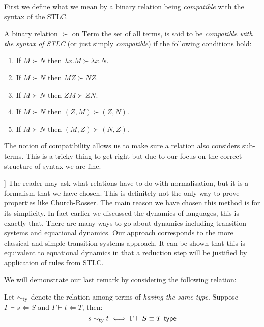 First we define what we mean by a binary relation being \emph{compatible} with the syntax of the STLC.
\begin{defin}
    A binary relation $\succ$ on $\mathrm{Term}$ the set of all terms, is said to be \emph{compatible with the syntax of STLC} (or just simply \emph{compatible}) if the following conditions hold:
    \begin{enumerate}
        \item If $M \succ N$ then $\lambda x . M \succ \lambda x . N$.
        \item If $M \succ N$ then $M Z \succ N Z$.
        \item If $M \succ N$ then $Z M \succ Z N$.
        \item If $M \succ N$ then $(Z,M) \succ (Z,N)$.
        \item If $M \succ N$ then $(M, Z) \succ (N, Z)$.
    \end{enumerate}
\end{defin}

\begin{remark}
    The notion of compatibility allows us to make sure a relation also considers sub-terms. This is a tricky thing to get right but due to our focus on the correct structure of syntax we are fine.
\end{remark}

\begin{remark}
[[CLEAN THIS UP]]
    The reader may ask what relations have to do with normalisation, but it is a formalism that we have chosen. This is definitely not the only way to prove properties like Church-Rosser. The main reason we have chosen this method is for its simplicity. In fact earlier we discussed the dynamics of languages, this is exactly that. There are many ways to go about dynamics including transition systems and equational dynamics. Our approach corresponds to the more classical and simple transition systems approach. It can be shown that this is equivalent to equational dynamics in that a reduction step will be justified by application of rules from STLC.
\end{remark}

We will demonstrate our last remark by considering the following relation:

\begin{defin}
    Let $\sim_{\mathrm{ty}}$ denote the relation among terms of \emph{having the same type}. Suppose $\Gamma \vdash s \Leftarrow S$ and $\Gamma \vdash t \Leftarrow T$, then:
    $$
        s \sim_{\mathrm{ty}} t \iff \Gamma \vdash S \equiv T \ \mathsf{type}
    $$
\end{defin}

